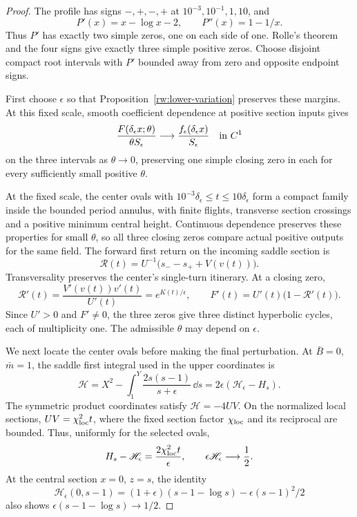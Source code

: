 \begin{proof}
The profile has signs $-,+,-,+$ at $10^{-3},10^{-1},1,10$, and
\[
 P'(x)=x-\log x-2,\qquad P''(x)=1-1/x.
\]
Thus $P'$ has exactly two simple zeros, one on each side of one.
Rolle's theorem and the four signs give exactly three simple positive
zeros. Choose disjoint compact root intervals with $P'$ bounded
away from zero and opposite endpoint signs.

First choose $\epsilon$ so that Proposition~\ref{rw:lower-variation}
preserves these margins. At this fixed scale, smooth coefficient
dependence at positive section inputs gives
\[
 \frac{F(\delta_\epsilon x;\theta)}
                 {\theta S_\epsilon}
 \longrightarrow
 \frac{f_\epsilon(\delta_\epsilon x)}{S_\epsilon}
 \quad\hbox{in }C^1
\]
on the three intervals as $\theta\to0$, preserving one simple
closing zero in each for every sufficiently small positive $\theta$.

At the fixed scale, the center ovals with
$10^{-3}\delta_\epsilon\le t\le10\delta_\epsilon$ form a compact
family inside the bounded period annulus, with finite flights,
transverse section crossings and a positive minimum central height.
Continuous dependence preserves these properties for small $\theta$,
so all three closing zeros compare actual positive outputs for the
same field. The forward first return on the incoming saddle section is
\[
 \mathcal R(t)=U^{-1}\bigl(s_--s_++V(v(t))\bigr).
\]
Transversality preserves the center's single-turn itinerary.
At a closing zero,
\begin{equation}\label{rw:lower:actual-return-multiplier}
 \mathcal R'(t)=\frac{V'(v(t))v'(t)}{U'(t)}=e^{K(t)/\epsilon},
 \qquad F'(t)=U'(t)\bigl(1-\mathcal R'(t)\bigr).
\end{equation}
Since $U'>0$ and $F'\ne0$, the three zeros give three distinct
hyperbolic cycles, each of multiplicity one. The admissible $\theta$
may depend on $\epsilon$.

We next locate the center ovals before making the final perturbation.
At $\bar B=0$, $\bar m=1$, the saddle first integral used in the
upper coordinates is
\[
 \mathcal H=X^2-\int_1^Y\frac{2s(s-1)}{s+\epsilon}\,\dd s
       =2\epsilon(\mathscr H_\epsilon-H_s).
\]
The symmetric product coordinates satisfy $\mathcal H=-4UV$.
On the normalized local sections,
$UV=\chi_{\rm loc}^2t$, where the fixed section factor
$\chi_{\rm loc}$ and its reciprocal are bounded.
Thus, uniformly for the selected ovals,
\begin{equation}\label{rw:lower:energy-localization}
 H_s-\mathscr H_\epsilon
          =\frac{2\chi_{\rm loc}^2t}{\epsilon},
 \qquad \epsilon\mathscr H_\epsilon\longrightarrow\frac12.
\end{equation}
At the central section $x=0$, $z=s$, the identity
\[
 \mathscr H_\epsilon(0,s-1)
     =(1+\epsilon)(s-1-\log s)
                          -\epsilon(s-1)^2/2
\]
also shows $\epsilon(s-1-\log s)\to1/2$.


\end{proof}
